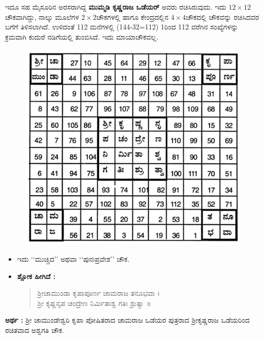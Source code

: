 ಇದೂ ಸಹ ಮೈಸೂರಿನ ಅರಸರಾಗಿದ್ದ \textbf{ಮುಮ್ಮಡಿ ಕೃಷ್ಣರಾಜ ಒಡೆಯರ್} ಅವರು ರಚಿಸಿರುವುದು. ಇದು $12 \times 12$ಚೌಕವಾಗಿದ್ದು, ನಾಲ್ಕು ಮೂಲೆಗಳ $2 \times 2$ಚೌಕಗಳಲ್ಲಿ ಹಾಗೂ ಕೇಂದ್ರದಲ್ಲಿನ $4 \times 4$ಚೌಕದಲ್ಲಿ ಚೌಕವನ್ನು ರಚಿಸಿದವರ ಬಗೆಗೆ ತಿಳಿಸಲಾಗಿದೆ. ಉಳಿದಂತೆ 112 ಮನೆಗಳಲ್ಲಿ (144-32=112) 1ರಿಂದ 112 ವರೆಗಿನ ಸಂಖ್ಯೆಗಳನ್ನು ಕ್ರಮವಾಗಿ ಕುದುರೆ ನಡಿಗೆಯಲ್ಲಿ ತುಂಬಿಸಿದೆ. ಇದು ಮಾಯಾಚೌಕವಲ್ಲ.
\begin{figure}[H]
\includegraphics{src/figures/chap6/fig6.11.jpg}
\end{figure}

\begin{itemize}
	\item ಇದು ‘‘ಮುಚ್ಚಿದ’’ ಅಥವಾ ‘‘ಪುನಃಪ್ರವೇಶ’’ ಚೌಕ.
	\item \textbf{ಶ್ಲೋಕ ಹೀಗಿದೆ :}
	\begin{quote}
	ಶ್ರೀಚಾಮುಂಡಾ ಕೃಪಾಪೂರ್ಣ ಚಾಮರಾಜ ತನೂಭವಾ ।\\
	ಶ್ರೀ ಕೃಷ್ಣನೃಪ ಚಂದ್ರೇಣ ನಿರ್ಮಿತಾಶ್ವ ಗತಿಃ ಶ್ರುತ್ವಾ ॥
	\end{quote}
\end{itemize}

\textbf{ಅರ್ಥ :} ಶ್ರೀ ಚಾಮುಂಡೇಶ್ವರಿ ಕೃಪಾ ಪೋಷಿತರಾದ ಚಾಮರಾಜ ಒಡೆಯರ ಪುತ್ರರಾದ ಶ್ರೀಕೃಷ್ಣರಾಜ ಒಡೆಯರಿಂದ ರಚಿತವಾದ ಅಶ್ವಗತಿ ಚೌಕ.

